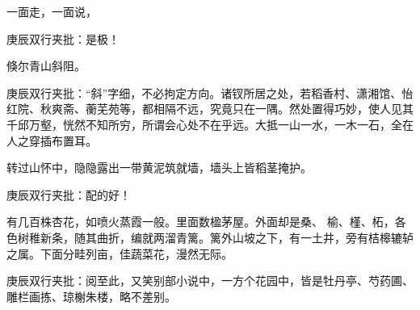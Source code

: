 \begin{parag}
    一面走，一面说，\begin{note}庚辰双行夹批：是极！\end{note}倏尔青山斜阻。\begin{note}庚辰双行夹批：“斜”字细，不必拘定方向。诸钗所居之处，若稻香村、潇湘馆、怡红院、秋爽斋、蘅芜苑等，都相隔不远，究竟只在一隅。然处置得巧妙，使人见其千邱万壑，恍然不知所穷，所谓会心处不在乎远。大抵一山一水，一木一石，全在人之穿插布置耳。\end{note}转过山怀中，隐隐露出一带黄泥筑就墙，墙头上皆稻茎掩护。\begin{note}庚辰双行夹批：配的好！\end{note}有几百株杏花，如喷火蒸霞一般。里面数楹茅屋。外面却是桑、 榆、槿、柘，各色树稚新条，随其曲折，编就两溜青篱。篱外山坡之下，有一土井，旁有桔槔辘轳之属。下面分畦列亩，佳蔬菜花，漫然无际。\begin{note}庚辰双行夹批：阅至此，又笑别部小说中，一方个花园中，皆是牡丹亭、芍药圃、雕栏画拣、琼榭朱楼，略不差别。\end{note}
\end{parag}


